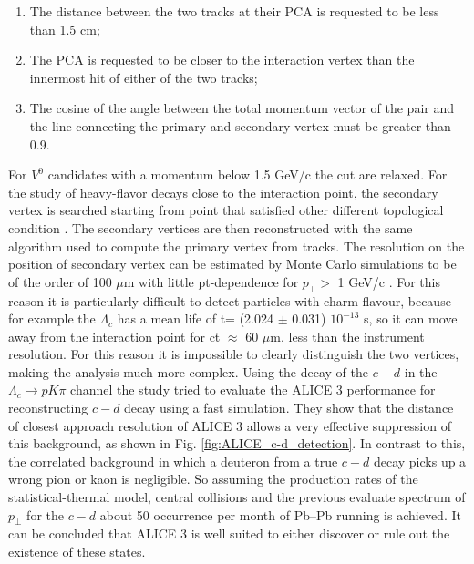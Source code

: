 \documentclass[12pt,a4paper]{book}
\begin{document}
\begin{enumerate}
	\item The distance between the two tracks at their PCA is requested to be less than 1.5 cm;
	\item The PCA is requested to be closer to the interaction vertex than the innermost hit of either of the two tracks;
	\item The cosine of the angle between the total momentum vector of the pair and the line connecting the primary and secondary vertex must be greater than 0.9.
\end{enumerate} 
For $V^0$ candidates with a momentum below 1.5 GeV/c the cut are relaxed. For the study of heavy-flavor decays close to the interaction point, the secondary vertex is searched starting from point that satisfied other different topological condition \cite{ALICE:2014sbxFs}. The secondary vertices are then reconstructed with the same algorithm used to compute the primary vertex from tracks. The resolution on the position of secondary vertex can be estimated by Monte Carlo simulations to be of the order of 100 $\mu$m with little pt-dependence for $p_\perp >$ 1 GeV/c \cite{2012}. For this reason it is particularly difficult to detect particles with charm flavour, because for example the $\Lambda_c$ has a mean life of t= (2.024 $\pm$ 0.031) $10^{-13}$ s, so it can move away from the interaction point for ct $\approx$ 60 $\mu$m, less than the instrument resolution. For this reason it is impossible to clearly distinguish the two vertices, making the analysis much more complex. Using the decay of the $c-d$ in the $\Lambda_c \to p K \pi$ channel the study \cite{alicecollaboration2022letterintentalice3} tried to evaluate the ALICE 3 performance for reconstructing $c-d$ decay using a fast simulation. They show that the distance of closest approach resolution of ALICE 3 allows a very effective suppression of this background, as shown in Fig. \ref{fig:ALICE_c-d_detection}. In contrast to this, the correlated background in which a deuteron from a true $c-d$ decay picks up a wrong pion or kaon is negligible. So assuming the production rates of the statistical-thermal model, central collisions and the previous evaluate spectrum of $p_\perp$ for the $c-d$ about 50 occurrence per month of Pb–Pb running is achieved. It can be concluded that ALICE 3 is well suited to either discover or rule out the existence of these states.
\end{document}
